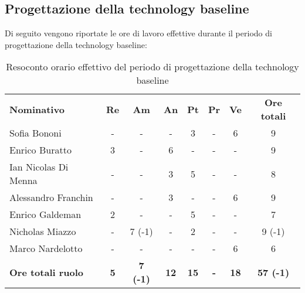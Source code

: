 \documentclass[../piano-di-progetto.tex]{subfiles}
\begin{document}
\subsection{Progettazione della technology baseline}

Di seguito vengono riportate le ore di lavoro effettive durante il periodo di progettazione della technology baseline:
\begin{table}[H]
    \centering
    \begin{tabular}{lccccccc}
      \rowcolor{lightgray}
      \textbf{Nominativo}       & \textbf{Re}      & \textbf{Am} & \textbf{An}      & \textbf{Pt} & \textbf{Pr} & \textbf{Ve} & \textbf{Ore totali} \\
        Sofia Bononi              & -          & -               & -           & 3           & -          & 6           & 9                \\
Enrico Buratto            & 3          & -               & 6           & -           & -          & -           & 9                \\
Ian Nicolas Di Menna      & -          & -               & 3           & 5           & -          & -           & 8                \\
Alessandro Franchin       & -          & -               & 3           & -           & -          & 6           & 9                \\
Enrico Galdeman           & 2          & -               & -           & 5           & -          & -           & 7                \\
Nicholas Miazzo           & -          & 7 (-1)          & -           & 2           & -          & -           & 9 (-1)           \\
Marco Nardelotto          & -          & -               & -           & -           & -          & 6           & 6                \\
\textbf{Ore totali ruolo} & \textbf{5} & \textbf{7 (-1)} & \textbf{12} & \textbf{15} & \textbf{-} & \textbf{18} & \textbf{57 (-1)}
    \end{tabular}
    \caption{Resoconto orario effettivo del periodo di progettazione della technology baseline}
  \end{table}
\end{document}
